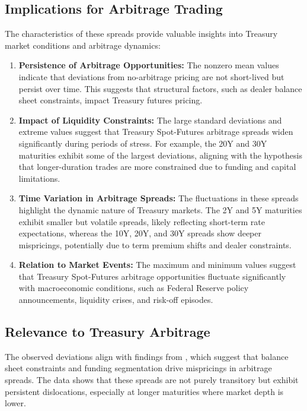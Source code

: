 \documentclass{article}
\begin{document}
\subsection{Implications for Arbitrage Trading}

The characteristics of these spreads provide valuable insights into Treasury market conditions and arbitrage dynamics:

\begin{enumerate}
    \item \textbf{Persistence of Arbitrage Opportunities:} The nonzero mean values indicate that deviations from no-arbitrage pricing are not short-lived but persist over time. This suggests that structural factors, such as dealer balance sheet constraints, impact Treasury futures pricing.

    \item \textbf{Impact of Liquidity Constraints:} The large standard deviations and extreme values suggest that Treasury Spot-Futures arbitrage spreads widen significantly during periods of stress. For example, the 20Y and 30Y maturities exhibit some of the largest deviations, aligning with the hypothesis that longer-duration trades are more constrained due to funding and capital limitations.

    \item \textbf{Time Variation in Arbitrage Spreads:} The fluctuations in these spreads highlight the dynamic nature of Treasury markets. The 2Y and 5Y maturities exhibit smaller but volatile spreads, likely reflecting short-term rate expectations, whereas the 10Y, 20Y, and 30Y spreads show deeper mispricings, potentially due to term premium shifts and dealer constraints.

    \item \textbf{Relation to Market Events:} The maximum and minimum values suggest that Treasury Spot-Futures arbitrage opportunities fluctuate significantly with macroeconomic conditions, such as Federal Reserve policy announcements, liquidity crises, and risk-off episodes.
\end{enumerate}

\subsection{Relevance to Treasury Arbitrage}

The observed deviations align with findings from \cite{siriwardane2023segmented}, which suggest that balance sheet constraints and funding segmentation drive mispricings in arbitrage spreads. The data shows that these spreads are not purely transitory but exhibit persistent dislocations, especially at longer maturities where market depth is lower.
\end{document}
